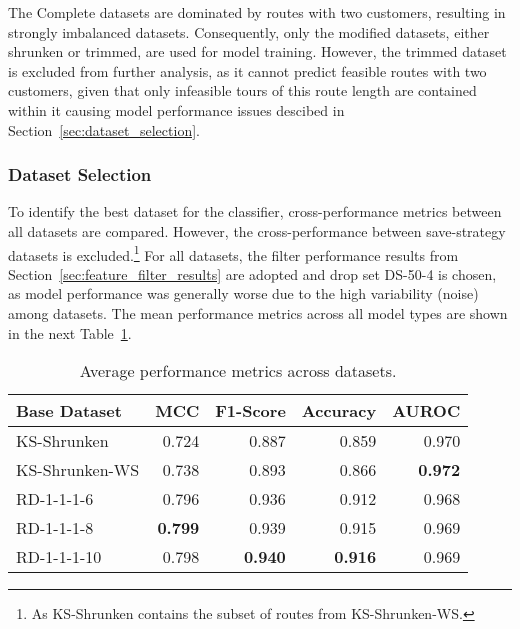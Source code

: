 The Complete datasets are dominated by routes with two customers, resulting in strongly imbalanced datasets. Consequently,
only the modified datasets, either shrunken or trimmed, are used for model training. However, the trimmed dataset is excluded
from further analysis, as it cannot predict feasible routes with two customers, given that only infeasible tours of this route
length are contained within it causing model performance issues descibed in Section~\ref{sec:dataset_selection}.

\subsubsection{Dataset Selection}

To identify the best dataset for the classifier, cross-performance metrics between all datasets are compared. However,
the cross-performance between save-strategy datasets is excluded.\footnote{As KS-Shrunken contains the subset of routes from KS-Shrunken-WS.} For all datasets,
the filter performance results from Section~\ref{sec:feature_filter_results} are adopted and drop set DS-50-4 is chosen,
as model performance was generally worse due to the high variability (noise) among datasets. The mean performance metrics
across all model types are shown in the next Table~\ref{tab:featurePerformance_krebs}.

\begin{table}[ht]
    \centering
    \small
    \begin{tabular}{lrrrr}
        \toprule
        Base Dataset   & MCC            & F1-Score       & Accuracy       & AUROC          \\
        \midrule
        KS-Shrunken    & 0.724          & 0.887          & 0.859          & 0.970          \\
        KS-Shrunken-WS & 0.738          & 0.893          & 0.866          & \textbf{0.972} \\
        RD-1-1-1-6     & 0.796          & 0.936          & 0.912          & 0.968          \\
        RD-1-1-1-8     & \textbf{0.799} & 0.939          & 0.915          & 0.969          \\
        RD-1-1-1-10    & 0.798          & \textbf{0.940} & \textbf{0.916} & 0.969          \\
        \bottomrule
    \end{tabular}
    \caption{Average performance metrics across \krebsADataSetText datasets.}
    \label{tab:featurePerformance_krebs}
\end{table}

